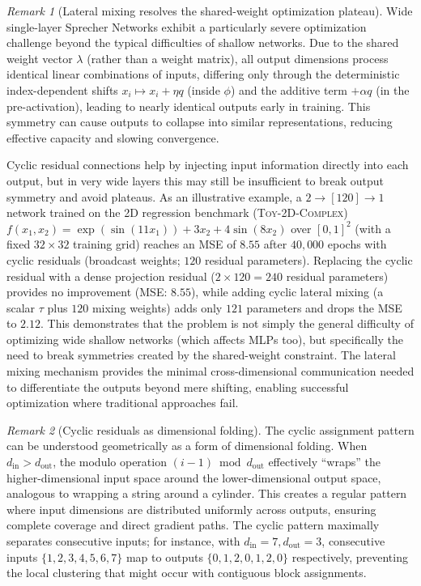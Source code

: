 \documentclass{article}
\theoremstyle{plain}
\theoremstyle{definition}
\theoremstyle{remark}
\newtheorem{remark}{Remark}
\begin{document}
\begin{remark}[Lateral mixing resolves the shared-weight optimization plateau]
Wide single-layer Sprecher Networks exhibit a particularly severe optimization challenge beyond the typical difficulties of shallow networks. Due to the shared weight vector $\lambda$ (rather than a weight matrix), all output dimensions process identical linear combinations of inputs, 
differing only through the deterministic index-dependent shifts $x_i\mapsto x_i+\eta q$ (inside $\phi$) and the additive term $+\alpha q$ (in the pre-activation), leading to nearly identical outputs early in training. This symmetry can cause outputs to collapse into similar representations, reducing effective capacity and slowing convergence. 

Cyclic residual connections help by injecting input information directly into each output, 
but in very wide layers this may still be insufficient to break output symmetry and avoid plateaus.
As an illustrative example, a $2\to[120]\to1$ network trained on the 2D regression benchmark (\textsc{Toy-2D-Complex}) $f(x_1,x_2)=\exp(\sin(11x_1))+3x_2+4\sin(8x_2)$ over $[0,1]^2$ (with a fixed $32\times 32$ training grid) reaches an MSE of $8.55$ after $40{,}000$ epochs with cyclic residuals (broadcast weights; $120$ residual parameters). Replacing the cyclic residual with a dense projection residual ($2\times120=240$ residual parameters) provides no improvement (MSE: $8.55$), while adding cyclic lateral mixing (a scalar $\tau$ plus $120$ mixing weights) adds only $121$ parameters and drops the MSE to $2.12$. This demonstrates that the problem is not simply the general difficulty of optimizing wide shallow networks (which affects MLPs too), but 
specifically the need to break symmetries created by the shared-weight constraint. The lateral mixing mechanism provides the minimal cross-dimensional communication needed to differentiate the outputs beyond mere shifting, enabling successful optimization where traditional approaches fail.
\end{remark}

\begin{remark}[Cyclic residuals as dimensional folding]
The cyclic assignment pattern can be understood geometrically as a form of dimensional folding. When $d_{\mathrm{in}} > d_{\mathrm{out}}$, the modulo operation $(i-1) \bmod d_{\mathrm{out}}$ effectively ``wraps'' the higher-dimensional input space around the lower-dimensional output space, analogous to wrapping a string around a cylinder. This creates a regular pattern where input dimensions are distributed uniformly across outputs, ensuring complete coverage and direct gradient paths. The cyclic pattern maximally separates consecutive inputs; for instance, with $d_{\mathrm{in}}=7, d_{\mathrm{out}}=3$, consecutive inputs $\{1,2,3,4,5,6,7\}$ map to outputs $\{0,1,2,0,1,2,0\}$ respectively, preventing the local clustering that might occur with contiguous block assignments.
\end{remark}
\end{document}
